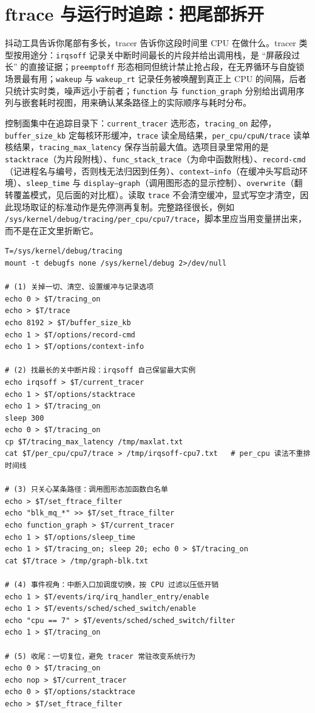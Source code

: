 \documentclass[12pt,a4paper,fontset=fandol]{ctexbook}
\newcommand{\Tp}[1]{\texttt{#1}}
\newcommand{\Bk}{\discretionary{}{}{}}
\begin{document}
\section{ftrace 与运行时追踪：把尾部拆开}

抖动工具告诉你尾部有多长，tracer 告诉你这段时间里 CPU 在做什么。tracer 类型按用途分：\Tp{irqsoff} 记录关中断时间最长的片段并给出调用栈，是 ``屏蔽段过长'' 的直接证据；\Tp{preemptoff} 形态相同但统计禁止抢占段，在无界循环与自旋锁场景最有用；\Tp{wakeup} 与 \Tp{wakeup\_rt} 记录任务被唤醒到真正上 CPU 的间隔，后者只统计实时类，噪声远小于前者；\Tp{function} 与 \Tp{function\_graph} 分别给出调用序列与嵌套耗时视图，用来确认某条路径上的实际顺序与耗时分布。

控制面集中在追踪目录下：\Tp{current\_{\Bk}tracer} 选形态，\Tp{tracing\_on} 起停，\Tp{buffer\_{\Bk}size\_{\Bk}kb} 定每核环形缓冲，\Tp{trace} 读全局结果，\Tp{per\_{\Bk}cpu/cpuN/trace} 读单核结果，\Tp{tracing\_{\Bk}max\_{\Bk}latency} 保存当前最大值。选项目录里常用的是 \Tp{stacktrace}（为片段附栈）、\Tp{func\_{\Bk}stack\_{\Bk}trace}（为命中函数附栈）、\Tp{record-cmd}（记进程名与编号，否则栈无法归因到任务）、\Tp{context--{\Bk}info}（在缓冲头写启动环境）、\Tp{sleep\_time} 与 \Tp{display--{\Bk}graph}（调用图形态的显示控制）、\Tp{overwrite}（翻转覆盖模式，见后面的对比框）。读取 \Tp{trace} 不会清空缓冲，显式写空才清空，因此现场取证的标准动作是先停测再复制。完整路径很长，例如 \Tp{/sys/kernel/debug/tracing/per{\Bk}\_cpu/cpu7/trace}，脚本里应当用变量拼出来，而不是在正文里折断它。

\begin{lstlisting}[style=shellstyle,caption={Shell：ftrace 切换 tracer、设置过滤与抓取尾部现场},label={lst:ch11-ftrace}]
T=/sys/kernel/debug/tracing
mount -t debugfs none /sys/kernel/debug 2>/dev/null

# (1) 关掉一切、清空、设置缓冲与记录选项
echo 0 > $T/tracing_on
echo > $T/trace
echo 8192 > $T/buffer_size_kb
echo 1 > $T/options/record-cmd
echo 1 > $T/options/context-info

# (2) 找最长的关中断片段：irqsoff 自己保留最大实例
echo irqsoff > $T/current_tracer
echo 1 > $T/options/stacktrace
echo 1 > $T/tracing_on
sleep 300
echo 0 > $T/tracing_on
cp $T/tracing_max_latency /tmp/maxlat.txt
cat $T/per_cpu/cpu7/trace > /tmp/irqsoff-cpu7.txt   # per_cpu 读法不重排时间线

# (3) 只关心某条路径：调用图形态加函数白名单
echo > $T/set_ftrace_filter
echo "blk_mq_*" >> $T/set_ftrace_filter
echo function_graph > $T/current_tracer
echo 1 > $T/options/sleep_time
echo 1 > $T/tracing_on; sleep 20; echo 0 > $T/tracing_on
cat $T/trace > /tmp/graph-blk.txt

# (4) 事件视角：中断入口加调度切换，按 CPU 过滤以压低开销
echo 1 > $T/events/irq/irq_handler_entry/enable
echo 1 > $T/events/sched/sched_switch/enable
echo "cpu == 7" > $T/events/sched/sched_switch/filter
echo 1 > $T/tracing_on

# (5) 收尾：一切复位，避免 tracer 常驻改变系统行为
echo 0 > $T/tracing_on
echo nop > $T/current_tracer
echo 0 > $T/options/stacktrace
echo > $T/set_ftrace_filter
\end{lstlisting}
\end{document}
